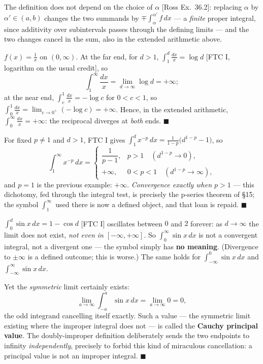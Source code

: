 \documentclass[11pt]{report}
\begin{document}
The definition does not depend on the choice of $\alpha$ [Ross Ex.\ 36.2]: replacing $\alpha$ by $\alpha' \in (a,b)$ changes the two summands by $\mp \int_\alpha^{\alpha'} f\,dx$ --- a \emph{finite} proper integral, since additivity over subintervals passes through the defining limits --- and the two changes cancel in the sum, also in the extended arithmetic above.

\begin{exbox}
$f(x) = \tfrac1x$ on $(0, \infty)$. At the far end, for $d > 1$, $\int_1^d \tfrac{dx}{x} = \log d$ [FTC I, logarithm on the usual credit], so
\[
\int_1^\infty \frac{dx}{x} = \lim_{d\to\infty} \log d = +\infty;
\]
at the near end, $\int_c^1 \tfrac{dx}{x} = -\log c$ for $0 < c < 1$, so $\int_0^1 \tfrac{dx}{x} = \lim_{c\to0^+}(-\log c) = +\infty$. Hence, in the extended arithmetic, $\int_0^\infty \tfrac{dx}{x} = +\infty$: the reciprocal diverges at \emph{both} ends. \hfill $\blacksquare$
\end{exbox}

\begin{exbox}
For fixed $p \neq 1$ and $d > 1$, FTC I gives $\int_1^d x^{-p}\,dx = \tfrac{1}{1-p}\bigl( d^{1-p} - 1 \bigr)$, so
\[
\int_1^\infty x^{-p}\,dx =
\begin{cases}
\dfrac{1}{p-1}, & p > 1 \quad (d^{1-p} \to 0), \\[2mm]
+\infty, & 0 < p < 1 \quad (d^{1-p} \to \infty),
\end{cases}
\]
and $p = 1$ is the previous example: $+\infty$. \emph{Convergence exactly when $p > 1$} --- this dichotomy, fed through the integral test, is precisely the p-series theorem of \S 15; the symbol $\int_1^\infty$ used there is now a defined object, and that loan is repaid. \hfill $\blacksquare$
\end{exbox}

\begin{exbox}
$\int_0^d \sin x\,dx = 1 - \cos d$ [FTC I] oscillates between $0$ and $2$ forever: as $d \to \infty$ the limit does not exist, \emph{not even in} $[-\infty, +\infty]$. So $\int_0^\infty \sin x\,dx$ is not a convergent integral, not a divergent one --- the symbol simply has \textbf{no meaning}. (Divergence to $\pm\infty$ is a defined outcome; this is worse.) The same holds for $\int_{-\infty}^0 \sin x\,dx$ and $\int_{-\infty}^\infty \sin x\,dx$.

Yet the \emph{symmetric} limit certainly exists:
\[
\lim_{a \to \infty} \int_{-a}^{a} \sin x\,dx = \lim_{a\to\infty} 0 = 0,
\]
the odd integrand cancelling itself exactly. Such a value --- the symmetric limit existing where the improper integral does not --- is called the \textbf{Cauchy principal value}. The doubly-improper definition deliberately sends the two endpoints to infinity \emph{independently}, precisely to forbid this kind of miraculous cancellation: a principal value is not an improper integral. \hfill $\blacksquare$
\end{exbox}
\end{document}
